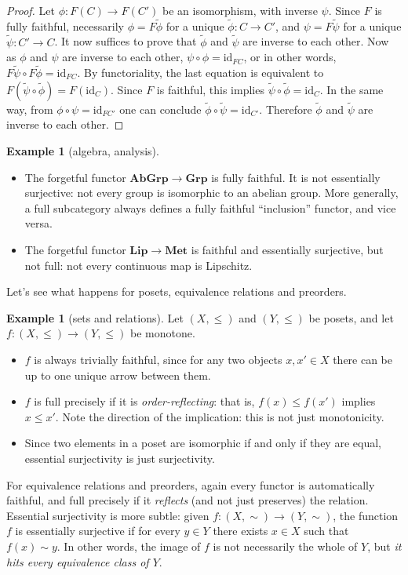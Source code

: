 \documentclass[a4paper,11pt,oneside]{scrbook}
\numberwithin{equation}{section}
\theoremstyle{plain}
\theoremstyle{definition}
\newtheorem{eg}[thm]{Example}
\newcommand{\cat}[1]{{\mathbf{#1}}} %
\newcommand{\Grp}{\cat{Grp}}
\DeclareMathOperator{\1}{\mathbbm{1}}
\DeclareMathOperator{\2}{\mathbbm{2}}
\newcommand{\id}{\mathrm{id}} %
\begin{document}
\begin{proof}
 Let $\phi:F(C)\to F(C')$ be an isomorphism, with inverse $\psi$. Since $F$ is fully faithful, necessarily $\phi=F\tilde{\phi}$ for a unique $\tilde{\phi}:C\to C'$, and $\psi=F\tilde{\psi}$ for a unique $\tilde{\psi}:C'\to C$. It now suffices to prove that $\tilde{\phi}$ and $\tilde{\psi}$ are inverse to each other. Now as $\phi$ and $\psi$ are inverse to each other, $\psi\circ\phi=\id_{FC}$, or in other words, $F\tilde{\psi}\circ F\tilde{\phi}=\id_{FC}$. By functoriality, the last equation is equivalent to $F(\tilde{\psi}\circ \tilde{\phi})=F(\id_C)$. Since $F$ is faithful, this implies $\tilde{\psi}\circ \tilde{\phi}=\id_C$. In the same way, from $\phi\circ\psi=\id_{FC'}$ one can conclude $\tilde{\phi}\circ \tilde{\psi}=\id_{C'}$. Therefore $\tilde{\phi}$ and $\tilde{\psi}$ are inverse to each other.
\end{proof}


\begin{eg}[algebra, analysis]
 \begin{itemize}
  \item The forgetful functor $\cat{AbGrp}\to\Grp$ is fully faithful. It is not essentially surjective: not every group is isomorphic to an abelian group.
  More generally, a full subcategory always defines a fully faithful ``inclusion'' functor, and vice versa. 
  \item The forgetful functor $\cat{Lip}\to\cat{Met}$ is faithful and essentially surjective, but not full: not every continuous map is Lipschitz. 
 \end{itemize}
\end{eg}

Let's see what happens for posets, equivalence relations and preorders.

\begin{eg}[sets and relations]
 Let $(X,\le)$ and $(Y,\le)$ be posets, and let $f:(X,\le)\to (Y,\le)$ be monotone. 
 \begin{itemize}
  \item $f$ is always trivially faithful, since for any two objects $x,x'\in X$ there can be up to one unique arrow between them.
  \item $f$ is full precisely if it is \emph{order-reflecting}: that is, $f(x)\le f(x')$ implies $x\le x'$. Note the direction of the implication: this is not just monotonicity. 
  \item Since two elements in a poset are isomorphic if and only if they are equal, essential surjectivity is just surjectivity.
 \end{itemize}

 For equivalence relations and preorders, again every functor is automatically faithful, and full precisely if it \emph{reflects} (and not just preserves) the relation. Essential surjectivity is more subtle: given $f:(X,\sim)\to (Y,\sim)$, the function $f$ is essentially surjective if for every $y\in Y$ there exists $x\in X$ such that $f(x)\sim y$. In other words, the image of $f$ is not necessarily the whole of $Y$, but \emph{it hits every equivalence class of $Y$}. 
\end{eg}
\end{document}
